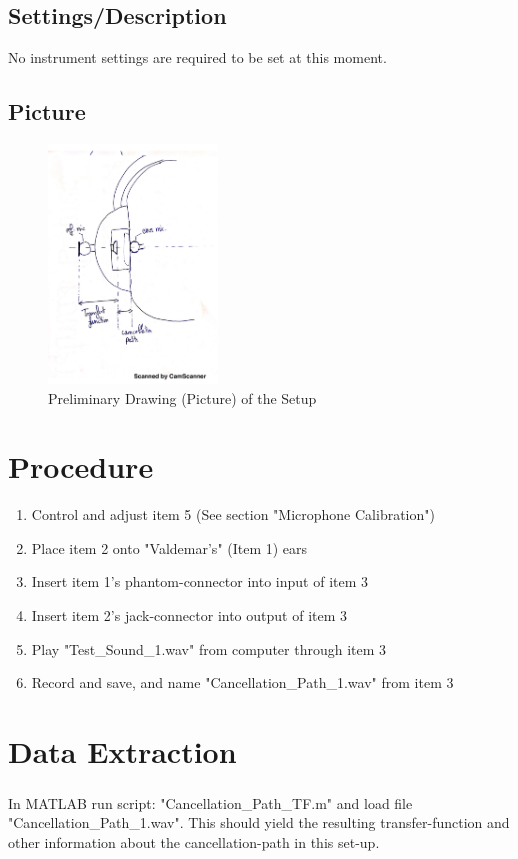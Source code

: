 \documentclass[12pt,a4paper,openright]{article}
\begin{document}
\subsection{Settings/Description}
No instrument settings are required to be set at this moment.

\subsection{Picture}
\begin{figure}[H]
	\centering
	\includegraphics[width=0.4\textwidth]{picture.png}
	\caption{Preliminary Drawing (Picture) of the Setup}
	\label{PictureDrawing}
\end{figure}

\section{Procedure}
\begin{enumerate}
	\item Control and adjust item 5 (See section "Microphone Calibration")
	\item Place item 2 onto "Valdemar's" (Item 1) ears
	\item Insert item 1's phantom-connector into input of item 3
	\item Insert item 2's jack-connector into output of item 3
	\item Play "Test\_Sound\_1.wav" from computer through item 3
	\item Record and save, and name "Cancellation\_Path\_1.wav" from item 3
\end{enumerate}

\section{Data Extraction}
In MATLAB\textsuperscript{\textregistered} run script: "Cancellation\_Path\_TF.m" and load file "Cancellation\_Path\_1.wav". This should yield the resulting transfer-function and other information about the cancellation-path in this set-up.
\end{document}
